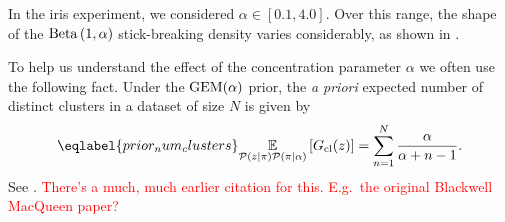 In the iris experiment, we considered $\alpha\in[0.1, 4.0]$.
Over this range, the shape of
the $\mathrm{Beta}\left(1, \alpha\right)$ stick-breaking density varies considerably, as shown in
.

\BetaPriorsEx

To help us understand the effect of the concentration parameter
$\alpha$ we often use the following fact. Under the $\mathrm{GEM}(\alpha)$ prior, the {\em a priori} expected
number of distinct clusters in a dataset of size $N$ is given by
%
\begin{align}\eqlabel{prior_num_clusters}
\expect{\p(\z \vert \pi)\p(\pi \vert \alpha)}{\nclusters(\z)} =
\sum_{\n = 1}^\N \frac{\alpha}{\alpha + \n - 1}.
\end{align}
%
See \citep[Equation 11]{Teh:2010:dp}. \textcolor{red}{There's a much, much earlier citation for this. E.g.\ the original Blackwell MacQueen paper?}
